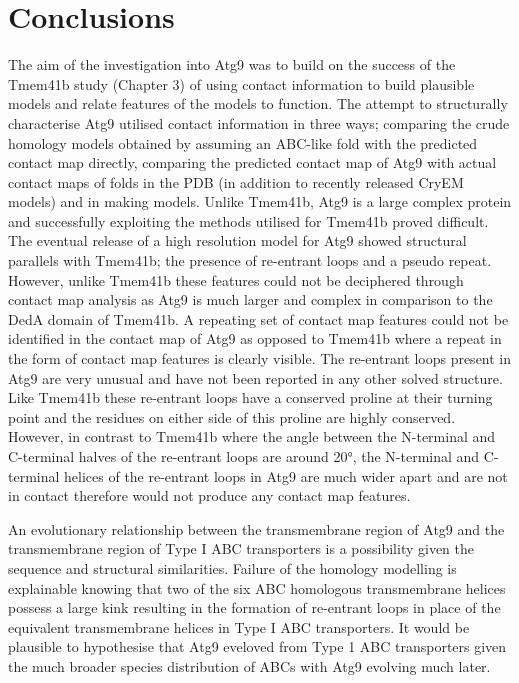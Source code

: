 \newpage
\section{Conclusions}
The aim of the investigation into Atg9 was to build on the success of the Tmem41b study (Chapter 3) of using contact information to build plausible models and relate features of the models to function.  The attempt to structurally characterise Atg9 utilised contact information in three ways; comparing the crude homology models obtained by assuming an ABC-like fold with the predicted contact map directly, comparing the predicted contact map of Atg9 with actual contact maps of folds in the PDB (in addition to recently released CryEM models) and in making models.  Unlike Tmem41b, Atg9 is a large complex protein and successfully exploiting the methods utilised for Tmem41b proved difficult.  The eventual release of a high resolution model for Atg9 showed structural parallels with Tmem41b; the presence of re-entrant loops and a pseudo repeat.  However, unlike Tmem41b these features could not be deciphered through contact map analysis as Atg9 is much larger and complex in comparison to the DedA domain of Tmem41b.  A repeating set of contact map features could not be identified in the contact map of Atg9 as opposed to Tmem41b where a repeat in the form of contact map features is clearly visible. The re-entrant loops present in Atg9 are very unusual and have not been reported in any other solved structure.  Like Tmem41b these re-entrant loops have a conserved proline at their turning point and the residues on either side of this proline are highly conserved. However, in contrast to Tmem41b where the angle between the N-terminal and C-terminal halves of the re-entrant loops are around 20°, the N-terminal and C-terminal helices of the re-entrant loops in Atg9 are much wider apart and are not in contact therefore would not produce any contact map features.

An evolutionary relationship between the transmembrane region of Atg9 and the transmembrane region of Type I ABC transporters is a possibility given the sequence and structural similarities. Failure of the homology modelling is explainable knowing that two of the six ABC homologous transmembrane helices possess a large kink resulting in the formation of re-entrant loops in place of the equivalent transmembrane helices in Type I ABC transporters.  It would be plausible to hypothesise that Atg9 eveloved from Type 1 ABC transporters given the much broader species distribution of ABCs with Atg9 evolving much later. 


